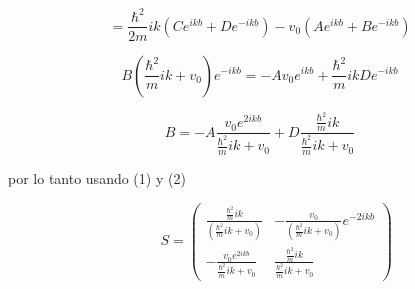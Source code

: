 \documentclass[12pt,a4paper]{article}
\begin{document}
\begin{enumerate}
    \begin{equation*}
        = \frac{\hbar^2}{2m}ik (Ce^{ikb} + D e^{-ikb}) -v_0 (A e^{ikb} +B e^{-ikb})
    \end{equation*}
    
    \begin{equation*}
        B(\frac{\hbar^2}{m}ik + v_0) e^{-ikb} =- A v_0 e^{ikb} + \frac{\hbar^2}{m} ik De^{-ikb}   
    \end{equation*}
    
    \begin{equation}
        B = - A \frac{v_0 e^{2ikb}}{\frac{\hbar^2}{m}ik + v_0} +D \frac{\frac{\hbar^2}{m} ik}{\frac{\hbar^2}{m}ik + v_0}  
    \end{equation}
    
    por lo tanto usando (1) y (2)
    
    
    \begin{equation*}
        \hspace{1cm} S = \left(\begin{matrix}
            \frac{\frac{\hbar^2}{m}ik}{(\frac{\hbar^2}{m}ik + v_0)} & -\frac{v_0}{(\frac{\hbar^2}{m}ik + v_0)} e^{-2ikb} \\
            -\frac{v_0 e^{2ikb}}{\frac{\hbar^2}{m}ik + v_0} & \frac{\frac{\hbar^2}{m} ik}{\frac{\hbar^2}{m}ik + v_0}
        \end{matrix}\right)
    \end{equation*}
    
\end{enumerate}
\end{document}
